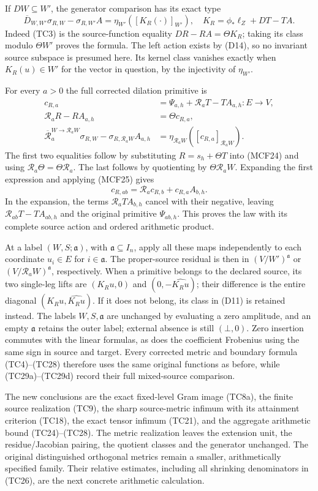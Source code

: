 If $DW\subseteq W'$, the generator comparison has its exact type
\[
\overline D_{W,W'}\sigma_{R,W}-\sigma_{R,W'}A
      =\eta_{W'}([K_R(\cdot)]_{W'}),
\quad K_R=\phi_*\ell_Z+DT-TA.
\tag{TC29b}
\]
Indeed (TC3) is the source-function equality
$DR-RA=\Theta K_R$; taking its class modulo $\Theta W'$ proves
the formula.  The left action exists by (D14), so no invariant
source subspace is presumed here.  Its kernel class vanishes
exactly when $K_R(u)\in W'$ for the vector in question, by the
injectivity of $\eta_{W'}$.

For every $a>0$ the full corrected dilation primitive is
\[
\begin{split}
c_{R,a}&=\Psi_{a,h}+\mathcal R_aT-TA_{a,h}:E\to V,\\
\mathcal R_aR-RA_{a,h}&=\Theta c_{R,a},\\
\overline{\mathcal R}_a^{W\to\mathcal R_aW}\sigma_{R,W}
 -\sigma_{R,\mathcal R_aW}A_{a,h}
 &=\eta_{\mathcal R_aW}([c_{R,a}]_{\mathcal R_aW}).
\end{split}
\tag{TC29c}
\]
The first two equalities follow by substituting $R=s_h+\Theta T$
into (MCF24) and using $\mathcal R_a\Theta=\Theta\mathcal R_a$.
The last follows by quotienting by $\Theta\mathcal R_aW$.
Expanding the first expression and applying (MCF25) gives
\[
c_{R,ab}=\mathcal R_ac_{R,b}+c_{R,a}A_{b,h}.
\tag{TC29d}
\]
In the expansion, the terms $\mathcal R_aT A_{b,h}$ cancel
with their negative, leaving $\mathcal R_{ab}T-TA_{ab,h}$
and the original primitive $\Psi_{ab,h}$.  This proves the law
with its complete source action and ordered arithmetic product.

At a label $(W,S;\mathfrak a)$, with $\mathfrak a\subseteq I_n$, apply all these maps independently to each
coordinate $u_i\in E$ for $i\in\mathfrak a$.  The proper-source residual
is then in $(V/W')^{\mathfrak a}$ or $(V/\mathcal R_aW)^{\mathfrak a}$, respectively.
When a primitive belongs to the declared source, its two single-leg
lifts are $(K_Ru,0)$ and $(0,-\widehat{K_Ru})$; their difference
is the entire diagonal $(K_Ru,\widehat{K_Ru})$.  If it does not
belong, its class in (D11) is retained instead.  The labels $W,S,\mathfrak a$
are unchanged by evaluating a zero amplitude, and an empty $\mathfrak a$
retains the outer label; external absence is still $(\bot,0)$.
Zero insertion commutes with the linear formulas, as does the
coefficient Frobenius using the same sign in source and target.
Every corrected metric and boundary formula (TC4)--(TC28) therefore
uses the same original functions as before, while (TC29a)--(TC29d)
record their full mixed-source comparison.

The new conclusions are the exact fixed-level Gram image (TC8a), the
finite source realization (TC9), the sharp
source-metric infimum with its attainment criterion (TC18), the exact
tensor infimum (TC21), and the aggregate arithmetic bound
(TC24)--(TC28).  The metric realization leaves the extension unit,
the residue/Jacobian pairing, the quotient classes and the generator
unchanged.  The original distinguished orthogonal metrics remain a
smaller, arithmetically specified family.  Their relative estimates,
including all shrinking denominators in (TC26), are the next concrete
arithmetic calculation.
